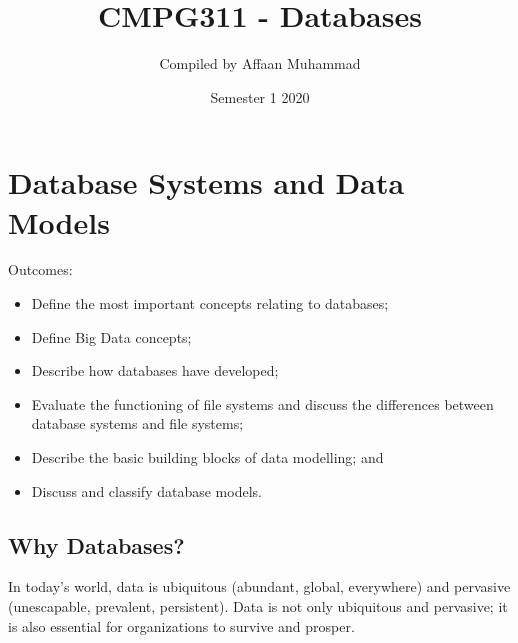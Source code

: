 \documentclass[a4paper, 12pt, titlepage]{report}
\begin{document}
\linespread{1.5}
\title{CMPG311 - Databases}
\author{Compiled by Affaan Muhammad}
\date{Semester 1 2020}
\maketitle
\tableofcontents{}
\chapter{Database Systems and Data Models}
Outcomes:
\begin{itemize}
\item Define the most important concepts relating to databases;
\item Define Big Data concepts;
\item Describe how databases have developed;
\item Evaluate the functioning of file systems and discuss the differences between database systems and file systems;
\item Describe the basic building blocks of data modelling; and
\item Discuss and classify database models.
\end{itemize}
\section{Why Databases?}
In today’s world, data is ubiquitous (abundant, global, everywhere) and pervasive (unescapable, prevalent, persistent). Data is not only ubiquitous and pervasive; it is also essential for organizations to survive and prosper.
\end{document}
